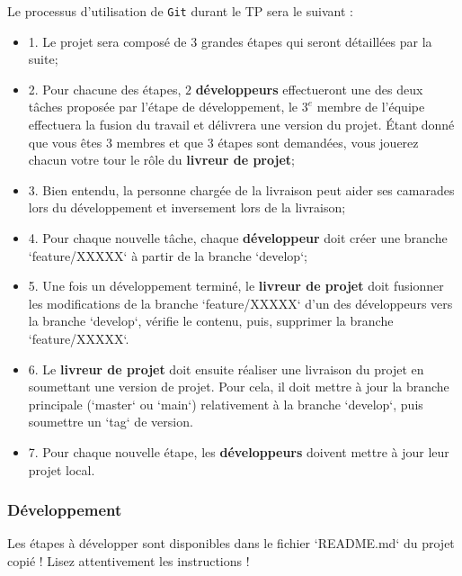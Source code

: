 \documentclass[11pt,a4paper,oneside]{article}
\begin{document}
\vspace{3mm}

Le processus d'utilisation de \texttt{Git} durant le TP sera le suivant : 

\begin{itemize}
	\item 1. Le projet sera composé de $3$ grandes étapes qui seront détaillées par la suite;
	\item 2. Pour chacune des étapes, $2$ \textbf{développeurs} effectueront une des deux tâches proposée par l'étape de développement, le $3^{e}$ membre de l'équipe effectuera la fusion du travail et délivrera une version du projet. Étant donné que vous êtes $3$ membres et que $3$ étapes sont demandées, vous jouerez chacun votre tour le rôle du \textbf{livreur de projet};
	\item 3. Bien entendu, la personne chargée de la livraison peut aider ses camarades lors du développement et inversement lors de la livraison;
	\item 4. Pour chaque nouvelle tâche, chaque \textbf{développeur} doit créer une branche `feature/XXXXX` à partir de la branche `develop`;
	\item 5. Une fois un développement terminé, le \textbf{livreur de projet} doit fusionner les modifications de la branche `feature/XXXXX` d'un des développeurs vers la branche `develop`, vérifie le contenu, puis, supprimer la branche `feature/XXXXX`.
	\item 6. Le \textbf{livreur de projet} doit ensuite réaliser une livraison du projet en soumettant une version de projet. Pour cela, il doit mettre à jour la branche principale (`master` ou `main`) relativement à la branche `develop`, puis soumettre un `tag` de version.
	\item 7. Pour chaque nouvelle étape, les \textbf{développeurs} doivent mettre à jour leur projet local.
\end{itemize}

\subsubsection{Développement}

Les étapes à développer sont disponibles dans le fichier `README.md` du projet copié ! Lisez attentivement les instructions !
\end{document}
